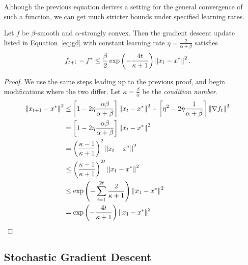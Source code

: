 Although the previous equation derives a setting for the general convergence of
such a function, we can get much stricter bounds under specified learning rates.

\begin{theorem}[Convergence for $\eta = 2 / (\alpha + \beta)$]
    Let $f$ be $\beta$-smooth and $\alpha$-strongly convex. Then the
    gradient descent update listed in Equation~\ref{eq:gd} with constant learning rate
    $\eta = \frac{2}{\alpha + \beta} $ satisfies
    \begin{equation}
        f_{t+1} - f^* \leq \frac{\beta}{2} \exp \left( - \frac{4t}{\kappa
        + 1} \right) \left\| x_1 - x^* \right\|^2.
    \end{equation}
\end{theorem}

\begin{proof}
    We use the same steps leading up to the previous proof, and begin
    modifications where the two differ. Let $\kappa = \frac{\beta}{\alpha} $ be
    the \emph{condition number}.
    \begin{equation}
        \begin{aligned}
            \left\| x_{t + 1} - x^* \right\|^2 
            &\leq \left[ 1 - 2\eta \frac{\alpha \beta}{\alpha + \beta}
            \right]\left\| x_t - x^* \right\|^2 + \left[  \eta^2  - 2\eta\frac{1}{\alpha +
            \beta} \right]\left\| \nabla f_t \right\|^2\\
            &= \left[ 1 - 2\eta \frac{\alpha \beta}{\alpha + \beta}
            \right]\left\| x_t - x^* \right\|^2 \\
            &= {\left( \frac{\kappa - 1}{\kappa + 1} 
            \right)}^2\left\| x_t - x^* \right\|^2 \\
            &\leq {\left( \frac{\kappa - 1}{\kappa + 1} 
            \right)}^{2t}\left\| x_1 - x^* \right\|^2 \\
            &\leq \exp \left( -\sum_{i = 1}^{2t} \frac{2}{\kappa
        + 1} \right) \left\| x_1 - x^* \right\|^2 \\
            &= \exp \left( - \frac{4t}{\kappa
        + 1} \right) \left\| x_1 - x^* \right\|^2
        \end{aligned}
    \end{equation}
\end{proof}

\subsection{Stochastic Gradient Descent}%
\label{sub:stochastic_gradient_descent}

